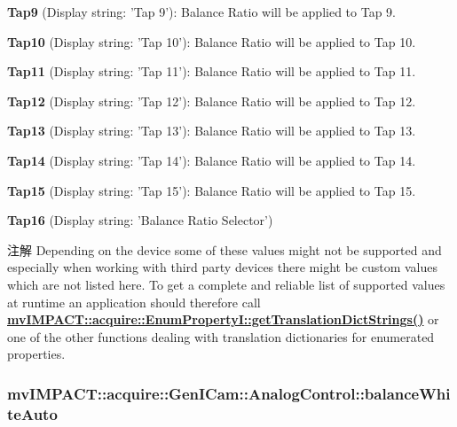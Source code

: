 \begin{DoxyItemize}
\item {\bfseries Tap9} (Display string\+: 'Tap 9')\+: Balance Ratio will be applied to Tap 9.
\item {\bfseries Tap10} (Display string\+: 'Tap 10')\+: Balance Ratio will be applied to Tap 10.
\item {\bfseries Tap11} (Display string\+: 'Tap 11')\+: Balance Ratio will be applied to Tap 11.
\item {\bfseries Tap12} (Display string\+: 'Tap 12')\+: Balance Ratio will be applied to Tap 12.
\item {\bfseries Tap13} (Display string\+: 'Tap 13')\+: Balance Ratio will be applied to Tap 13.
\item {\bfseries Tap14} (Display string\+: 'Tap 14')\+: Balance Ratio will be applied to Tap 14.
\item {\bfseries Tap15} (Display string\+: 'Tap 15')\+: Balance Ratio will be applied to Tap 15.
\item {\bfseries Tap16} (Display string\+: 'Balance Ratio Selector')
\end{DoxyItemize}

\begin{DoxyNote}{注解}
Depending on the device some of these values might not be supported and especially when working with third party devices there might be custom values which are not listed here. To get a complete and reliable list of supported values at runtime an application should therefore call {\bfseries \hyperlink{classmv_i_m_p_a_c_t_1_1acquire_1_1_enum_property_i_a0ba6ccbf5ee69784d5d0b537924d26b6}{mv\+I\+M\+P\+A\+C\+T\+::acquire\+::\+Enum\+Property\+I\+::get\+Translation\+Dict\+Strings()}} or one of the other functions dealing with translation dictionaries for enumerated properties. 
\end{DoxyNote}
\hypertarget{classmv_i_m_p_a_c_t_1_1acquire_1_1_gen_i_cam_1_1_analog_control_ac5a72d071c6ab6041347ec52179b0432}{
\subsubsection[{balance\+White\+Auto}]{ mv\+I\+M\+P\+A\+C\+T\+::acquire\+::\+Gen\+I\+Cam\+::\+Analog\+Control\+::balance\+White\+Auto}}\label{classmv_i_m_p_a_c_t_1_1acquire_1_1_gen_i_cam_1_1_analog_control_ac5a72d071c6ab6041347ec52179b0432}


